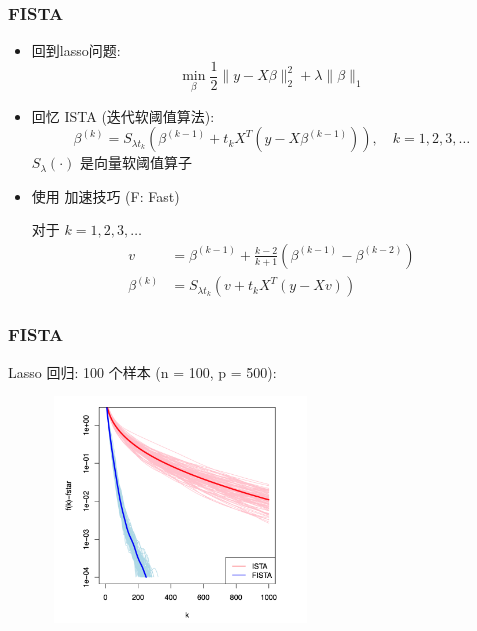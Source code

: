 \documentclass[handout]{beamer}
\begin{document}
\begin{frame}

\frametitle{FISTA}
\begin{itemize}
	\item 
回到lasso问题:
\begin{equation}
\min _{\beta} \frac{1}{2}\|y-X \beta\|_{2}^{2}+\lambda\|\beta\|_{1}
\end{equation}

\item 
回忆 ISTA (迭代软阈值算法):
\begin{equation}
\beta^{(k)}=S_{\lambda t_{k}}\left(\beta^{(k-1)}+t_{k} X^{T}\left(y-X \beta^{(k-1)}\right)\right), \quad k=1,2,3, \ldots
\end{equation}
$S_{\lambda}(\cdot)$ 是向量软阈值算子

\item 
使用 加速技巧  (F: Fast) 

对于 $k=1,2,3, \ldots$
\begin{equation}
\begin{aligned}
v &=\beta^{(k-1)}+\frac{k-2}{k+1}\left(\beta^{(k-1)}-\beta^{(k-2)}\right) \\
\beta^{(k)} &=S_{\lambda t_{k}}\left(v+t_{k} X^{T}(y-X v)\right)
\end{aligned}
\end{equation}

\end{itemize}
\end{frame}
\begin{frame}

\frametitle{FISTA}

Lasso  回归: 100 个样本 (n = 100, p = 500):
\begin{figure}
\centering
\includegraphics[height=6cm,width=7cm]{picture/FISTA.png}
\end{figure}

\end{frame}
\end{document}
